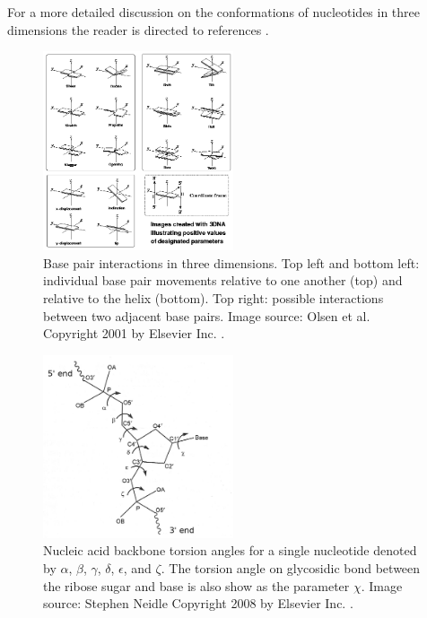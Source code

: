 \documentclass[journal]{IEEEtran}
\begin{document}
 For a more detailed discussion on the conformations of nucleotides in three dimensions the reader is directed to references \cite{neidle2010principles, schlick2010molecular, nowakowski1997rna}.

\begin{figure}[t]
\centering
\includegraphics[width=0.5\textwidth]{img/base_pair_interactions.png}
\caption{Base pair interactions in three dimensions. Top left and bottom left: individual base pair movements relative to one another (top) and relative to the helix (bottom). Top right: possible interactions between two adjacent base pairs. Image source: Olsen et al. Copyright 2001 by Elsevier Inc. \cite{Olson2001229}.}
\label{fig:base-pair-interactions}
\end{figure}

\begin{figure}[t]
\centering
\includegraphics[width=0.5\textwidth]{img/backbone_torsion_angles.png}
\caption{Nucleic acid backbone torsion angles for a single nucleotide denoted by $\alpha$, $\beta$, $\gamma$, $\delta$, $\epsilon$, and $\zeta$. The torsion angle on glycosidic bond between the ribose sugar and base is also show as the parameter $\chi$. Image source: Stephen Neidle Copyright 2008 by Elsevier Inc. \cite{neidle2010principles}.}
\label{fig:backbone-torsion-angles}
\end{figure}
\end{document}
